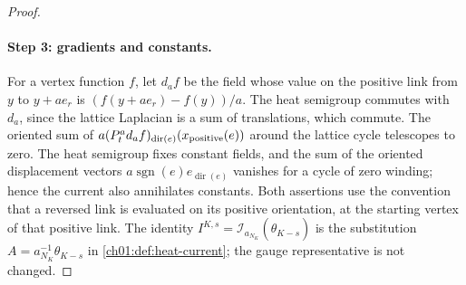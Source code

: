 \begin{proof}
\paragraph{Step 3: gradients and constants.}
For a vertex function $f$, let $d_af$ be the field whose value on the positive link from $y$ to $y+ae_r$ is $(f(y+ae_r)-f(y))/a$. The heat semigroup commutes with $d_a$, since the lattice Laplacian is a sum of translations, which commute. The oriented sum of $a(P^a_td_af)_{\operatorname{dir}(e)}(x_{\rm positive}(e))$ around the lattice cycle telescopes to zero. The heat semigroup fixes constant fields, and the sum of the oriented displacement vectors $a\operatorname{sgn}(e)e_{\operatorname{dir}(e)}$ vanishes for a cycle of zero winding; hence the current also annihilates constants. Both assertions use the convention that a reversed link is evaluated on its positive orientation, at the starting vertex of that positive link. The identity $I^{K,s}=\mathcal I_{a_{N_K}}(\widehat\theta_{K-s})$ is the substitution $A=a_{N_K}^{-1}\widehat\theta_{K-s}$ in \cref{ch01:def:heat-current}; the gauge representative is not changed.


\end{proof}
